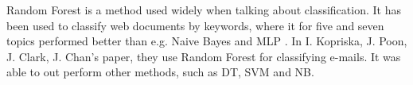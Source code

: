Random Forest is a method used widely when talking about classification. It has been used to classify web documents by keywords, where it for five and seven topics performed better than e.g. Naive Bayes and MLP \cite{keywords}. In I. Kopriska, J. Poon, J. Clark, J. Chan's paper, they use Random Forest for classifying e-mails. It was able to out perform other methods, such as DT, SVM and NB\cite{email}. 